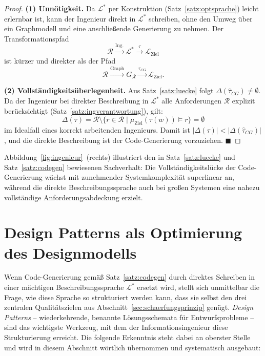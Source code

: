 ﻿\documentclass[a4paper,12pt]{report}
\theoremstyle{definition}
\begin{document}
\begin{proof}
\textbf{(1) Unnötigkeit.}
Da $\mathcal{L}^*$ per Konstruktion (Satz~\ref{satz:optsprache}) leicht erlernbar ist,
kann der Ingenieur direkt in $\mathcal{L}^*$ schreiben, ohne den Umweg über ein
Graphmodell und eine anschließende Generierung zu nehmen. Der Transformationspfad
\[
  \mathcal{R} \xrightarrow{\text{Ing.}} \mathcal{L}^* \xrightarrow{\tau} \mathcal{L}_{\text{Ziel}}
\]
ist kürzer und direkter als der Pfad
\[
  \mathcal{R} \xrightarrow{\text{Graph}} G_\mathcal{R} \xrightarrow{\hat{\tau}_{CG}} \mathcal{L}_{\text{Ziel}}.
\]

\textbf{(2) Vollständigkeitsüberlegenheit.}
Aus Satz~\ref{satz:luecke} folgt $\Delta(\hat{\tau}_{CG}) \neq \emptyset$.
Da der Ingenieur bei direkter Beschreibung in $\mathcal{L}^*$ alle Anforderungen
$\mathcal{R}$ explizit berücksichtigt (Satz~\ref{satz:ingverantwortung}), gilt:
\[
  \Delta(\tau) = \mathcal{R} \setminus \{r \in \mathcal{R} \mid \mu_{\text{Ziel}}(\tau(w)) \models r\}
  = \emptyset
\]
im Idealfall eines korrekt arbeitenden Ingenieurs.
Damit ist $|\Delta(\tau)| < |\Delta(\hat{\tau}_{CG})|$, und die direkte Beschreibung
ist der Code-Generierung vorzuziehen. $\blacksquare$
\end{proof}

Abbildung~\ref{fig:ingenieur}~(rechts) illustriert den in Satz~\ref{satz:luecke} und
Satz~\ref{satz:codegen} bewiesenen Sachverhalt: Die Vollständigkeitslücke der
Code-Generierung wächst mit zunehmender Systemkomplexität superlinear an, während
die direkte Beschreibungssprache auch bei großen Systemen eine nahezu vollständige
Anforderungsabdeckung erzielt.

\section{Design Patterns als Optimierung des Designmodells}
\label{sec:design-patterns}

Wenn Code-Generierung gemäß Satz~\ref{satz:codegen} durch direktes Schreiben in
einer mächtigen Beschreibungssprache $\mathcal{L}^*$ ersetzt wird, stellt sich
unmittelbar die Frage, wie diese Sprache so strukturiert werden kann, dass sie
selbst den drei zentralen Qualitätszielen aus Abschnitt~\ref{sec:schaerfungsprinzip}
genügt. \emph{Design Patterns} -- wiederkehrende, benannte Lösungsschemata für
Entwurfsprobleme -- sind das wichtigste Werkzeug, mit dem der Informationsingenieur
diese Strukturierung erreicht. Die folgende Erkenntnis steht dabei an oberster
Stelle und wird in diesem Abschnitt wörtlich übernommen und systematisch ausgebaut:
\end{document}
